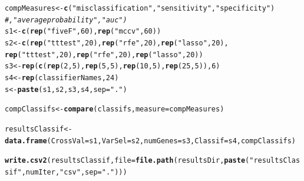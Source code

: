 \documentclass{article}\usepackage[]{graphicx}\usepackage[]{color}
\makeatletter
\newcommand{\hlnum}[1]{\textcolor[rgb]{0.686,0.059,0.569}{#1}}%
\newcommand{\hlstr}[1]{\textcolor[rgb]{0.192,0.494,0.8}{#1}}%
\newcommand{\hlcom}[1]{\textcolor[rgb]{0.678,0.584,0.686}{\textit{#1}}}%
\newcommand{\hlstd}[1]{\textcolor[rgb]{0.345,0.345,0.345}{#1}}%
\newcommand{\hlkwb}[1]{\textcolor[rgb]{0.69,0.353,0.396}{#1}}%
\newcommand{\hlkwc}[1]{\textcolor[rgb]{0.333,0.667,0.333}{#1}}%
\newcommand{\hlkwd}[1]{\textcolor[rgb]{0.737,0.353,0.396}{\textbf{#1}}}%
\newenvironment{kframe}{%
 \def\at@end@of@kframe{}%
 \ifinner\ifhmode%
  \def\at@end@of@kframe{\end{minipage}}%
  \begin{minipage}{\columnwidth}%
 \fi\fi%
 \def\FrameCommand##1{\hskip\@totalleftmargin \hskip-\fboxsep
 \colorbox{shadecolor}{##1}\hskip-\fboxsep
     \hskip-\linewidth \hskip-\@totalleftmargin \hskip\columnwidth}%
 \MakeFramed {\advance\hsize-\width
   \@totalleftmargin\z@ \linewidth\hsize
   \@setminipage}}%
 {\par\unskip\endMakeFramed%
 \at@end@of@kframe}
\newenvironment{knitrout}{}{} %
\makeatother
\begin{document}
\begin{knitrout}
\color{fgcolor}\begin{kframe}
\begin{alltt}
\hlstd{compMeasures} \hlkwb{<-}  \hlkwd{c}\hlstd{(}\hlstr{"misclassification"}\hlstd{,} \hlstr{"sensitivity"}\hlstd{,} \hlstr{"specificity"}\hlstd{)}
                  \hlcom{# , "average probability", "auc")}
\hlstd{s1} \hlkwb{<-} \hlkwd{c}\hlstd{(}\hlkwd{rep}\hlstd{(}\hlstr{"fiveF"}\hlstd{,} \hlnum{60}\hlstd{),} \hlkwd{rep}\hlstd{(}\hlstr{"mccv"}\hlstd{,} \hlnum{60}\hlstd{))}
\hlstd{s2}\hlkwb{<-} \hlkwd{c}\hlstd{(}\hlkwd{rep}\hlstd{(}\hlstr{"tttest"}\hlstd{,}\hlnum{20}\hlstd{),} \hlkwd{rep} \hlstd{(}\hlstr{"rfe"}\hlstd{,}\hlnum{20}\hlstd{) ,}\hlkwd{rep}\hlstd{(}\hlstr{"lasso"}\hlstd{,}\hlnum{20}\hlstd{),}
       \hlkwd{rep}\hlstd{(}\hlstr{"tttest"}\hlstd{,}\hlnum{20}\hlstd{),} \hlkwd{rep}\hlstd{(}\hlstr{"rfe"}\hlstd{,}\hlnum{20}\hlstd{),} \hlkwd{rep}\hlstd{(}\hlstr{"lasso"}\hlstd{,}\hlnum{20}\hlstd{))}
\hlstd{s3} \hlkwb{<-} \hlkwd{rep}\hlstd{(}\hlkwd{c}\hlstd{(}\hlkwd{rep}\hlstd{(}\hlnum{2}\hlstd{,}\hlnum{5}\hlstd{),} \hlkwd{rep}\hlstd{(}\hlnum{5}\hlstd{,}\hlnum{5}\hlstd{),}\hlkwd{rep}\hlstd{(}\hlnum{10}\hlstd{,}\hlnum{5}\hlstd{),} \hlkwd{rep}\hlstd{(}\hlnum{25}\hlstd{,}\hlnum{5}\hlstd{)),}\hlnum{6}\hlstd{)}
\hlstd{s4} \hlkwb{<-} \hlkwd{rep}\hlstd{(classifierNames,} \hlnum{24}\hlstd{)}
\hlstd{s} \hlkwb{<-} \hlkwd{paste}\hlstd{(s1,s2,s3,s4,} \hlkwc{sep}\hlstd{=}\hlstr{"."}\hlstd{)}

\hlstd{compClassifs} \hlkwb{<-} \hlkwd{compare}\hlstd{(classifs,}  \hlkwc{measure} \hlstd{= compMeasures)}
\end{alltt}


{\ttfamily\noindent\bfseries\color{errorcolor}{\#\# Error in evaluation(clresultlist[[j]], measure = measure[i]): 'sensitivity', 'specificity' or 'auc' are only computed for binary classification}}\begin{alltt}
\hlstd{resultsClassif} \hlkwb{<-} \hlkwd{data.frame}\hlstd{(}\hlkwc{CrossVal}\hlstd{=s1,} \hlkwc{VarSel}\hlstd{=s2,} \hlkwc{numGenes}\hlstd{=s3,} \hlkwc{Classif}\hlstd{=s4,compClassifs)}
\end{alltt}


{\ttfamily\noindent\bfseries\color{errorcolor}{\#\# Error in data.frame(CrossVal = s1, VarSel = s2, numGenes = s3, Classif = s4, : object 'compClassifs' not found}}\begin{alltt}
\hlkwd{write.csv2}\hlstd{(resultsClassif,} \hlkwc{file}\hlstd{=}\hlkwd{file.path}\hlstd{(resultsDir,} \hlkwd{paste}\hlstd{(}\hlstr{"resultsClassif"}\hlstd{, numIter,} \hlstr{"csv"}\hlstd{,} \hlkwc{sep}\hlstd{=}\hlstr{"."}\hlstd{)))}
\end{alltt}


{\ttfamily\noindent\bfseries\color{errorcolor}{\#\# Error in is.data.frame(x): object 'resultsClassif' not found}}\end{kframe}
\end{knitrout}

 
\end{document}
